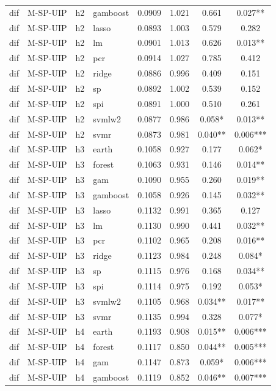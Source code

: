 \begin{ThreePartTable}
\begin{longtable}[t]{llclcccc}
dif & M-SP-UIP & h2 & gamboost & 0.0909 & 1.021 & 0.661 & 0.027**\\
dif & M-SP-UIP & h2 & lasso & 0.0893 & 1.003 & 0.579 & 0.282\\
dif & M-SP-UIP & h2 & lm & 0.0901 & 1.013 & 0.626 & 0.013**\\
dif & M-SP-UIP & h2 & pcr & 0.0914 & 1.027 & 0.785 & 0.412\\
dif & M-SP-UIP & h2 & ridge & 0.0886 & 0.996 & 0.409 & 0.151\\
dif & M-SP-UIP & h2 & sp & 0.0892 & 1.002 & 0.539 & 0.152\\
dif & M-SP-UIP & h2 & spi & 0.0891 & 1.000 & 0.510 & 0.261\\
dif & M-SP-UIP & h2 & svmlw2 & 0.0877 & 0.986 & 0.058* & 0.013**\\
dif & M-SP-UIP & h2 & svmr & 0.0873 & 0.981 & 0.040** & 0.006***\\
\addlinespace
dif & M-SP-UIP & h3 & earth & 0.1058 & 0.927 & 0.177 & 0.062*\\
dif & M-SP-UIP & h3 & forest & 0.1063 & 0.931 & 0.146 & 0.014**\\
dif & M-SP-UIP & h3 & gam & 0.1090 & 0.955 & 0.260 & 0.019**\\
dif & M-SP-UIP & h3 & gamboost & 0.1058 & 0.926 & 0.145 & 0.032**\\
dif & M-SP-UIP & h3 & lasso & 0.1132 & 0.991 & 0.365 & 0.127\\
dif & M-SP-UIP & h3 & lm & 0.1130 & 0.990 & 0.441 & 0.032**\\
dif & M-SP-UIP & h3 & pcr & 0.1102 & 0.965 & 0.208 & 0.016**\\
dif & M-SP-UIP & h3 & ridge & 0.1123 & 0.984 & 0.248 & 0.084*\\
dif & M-SP-UIP & h3 & sp & 0.1115 & 0.976 & 0.168 & 0.034**\\
dif & M-SP-UIP & h3 & spi & 0.1114 & 0.975 & 0.192 & 0.053*\\
dif & M-SP-UIP & h3 & svmlw2 & 0.1105 & 0.968 & 0.034** & 0.017**\\
dif & M-SP-UIP & h3 & svmr & 0.1135 & 0.994 & 0.328 & 0.077*\\
\addlinespace
dif & M-SP-UIP & h4 & earth & 0.1193 & 0.908 & 0.015** & 0.006***\\
dif & M-SP-UIP & h4 & forest & 0.1117 & 0.850 & 0.044** & 0.005***\\
dif & M-SP-UIP & h4 & gam & 0.1147 & 0.873 & 0.059* & 0.006***\\
dif & M-SP-UIP & h4 & gamboost & 0.1119 & 0.852 & 0.046** & 0.007***\\

\end{longtable}
\end{ThreePartTable}
